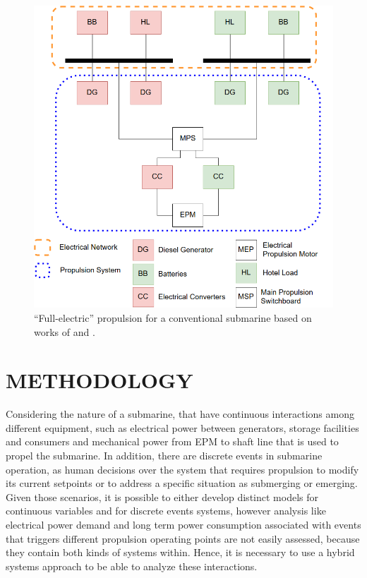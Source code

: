 \documentclass[10pt,fleqn,a4paper,twoside]{article}
\begin{document}
	\begin{figure}[h!]
		\centering
		\includegraphics[angle=0, scale=0.300]{prop_arch.png}
		\caption{``Full-electric'' propulsion for a conventional submarine based on works of \citet{Geertsma2017} and \citet{Pereira2016}.}
		\label{fig:full}
	\end{figure}

	\section{METHODOLOGY}
	\label{sec:method}


	Considering the nature of a submarine, that have continuous interactions among different equipment, such as electrical power between generators, storage facilities and consumers and mechanical power from EPM to shaft line that is used to propel the submarine. In addition, there are discrete events in submarine operation, as human decisions over the system that requires propulsion to modify its current setpoints or to address a specific situation as submerging or emerging. Given those scenarios, it is possible to either develop distinct models for continuous variables and for discrete events systems, however analysis like electrical power demand and long term power consumption associated with events that triggers different propulsion operating points are not easily assessed, because they contain both kinds of systems within. Hence, it is necessary to use a hybrid systems approach to be able to analyze these interactions.
\end{document}
